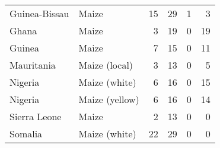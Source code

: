 \begin{table}[ht]
\begin{tabular}{llrrrr}
  Guinea-Bissau & Maize &  15 &  29 &   1 &   3 \\ 
  Ghana & Maize &   3 &  19 &   0 &  19 \\ 
  Guinea & Maize &   7 &  15 &   0 &  11 \\ 
  Mauritania & Maize (local) &   3 &  13 &   0 &   5 \\ 
  Nigeria & Maize (white) &   6 &  16 &   0 &  15 \\ 
  Nigeria & Maize (yellow) &   6 &  16 &   0 &  14 \\ 
  Sierra Leone & Maize &   2 &  13 &   0 &   0 \\ 
  Somalia & Maize (white) &  22 &  29 &   0 &   0 \\ 
   \hline
\end{tabular}
\end{table}
